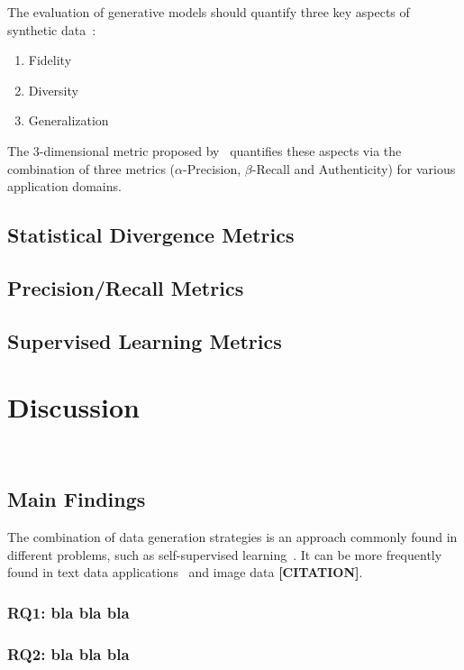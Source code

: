 \documentclass[parskip=full]{scrartcl}
\begin{document}
The evaluation of generative models should quantify three key aspects of
synthetic data~\cite{alaa2022faithful}:

\begin{enumerate}
    \item Fidelity
    \item Diversity 
    \item Generalization
\end{enumerate}

The 3-dimensional metric proposed by~\citet{alaa2022faithful} quantifies these
aspects via the combination of three metrics ($\alpha$-Precision,
$\beta$-Recall and Authenticity) for various application domains.

\subsection{Statistical Divergence Metrics} 

\subsection{Precision/Recall Metrics}

\subsection{Supervised Learning Metrics}

\section{Discussion}~\label{sec:discussion}

\subsection{Main Findings}

The combination of data generation strategies is an approach commonly found in
different problems, such as self-supervised
learning~\cite{grill2020bootstrap}. It can be more frequently found in text
data applications~\cite{bayer2021survey} and image data \textbf{[CITATION]}.

\subsubsection{RQ1: bla bla bla}

\subsubsection{RQ2: bla bla bla}
\end{document}
